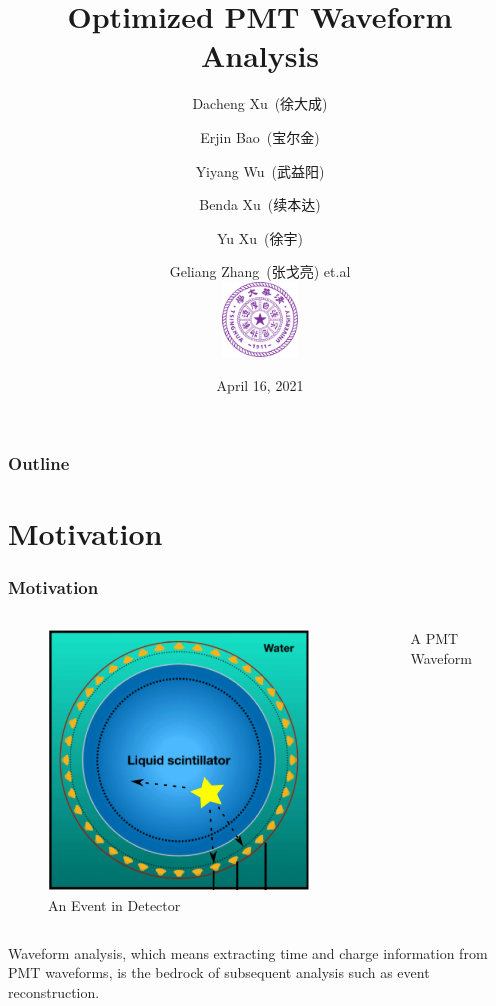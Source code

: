\documentclass{beamer}
\title[Waveform Analysis]{Optimized PMT Waveform Analysis}
\author[Dacheng Xu]{Dacheng Xu~(徐大成) \and Erjin Bao~(宝尔金) \and Yiyang Wu~(武益阳) \and Benda Xu~(续本达) \and Yu Xu~(徐宇) \and Geliang Zhang~(张戈亮) et.al \\ [4mm] \includegraphics[height=2cm]{img/Tsinghua_University_Logo.png}}
\date[JUNO]{April 16, 2021}
\begin{document}
\frame{\titlepage}

\begin{frame}[noframenumbering]
\frametitle{Outline}
\thispagestyle{empty}
\tableofcontents
\end{frame}

\section{Motivation}

\begin{frame}
\frametitle{Motivation}
\begin{columns}
\begin{figure}
    \centering
    \includegraphics[width=1.0\linewidth]{img/event.png}
    \caption{An Event in Detector}
\end{figure}
\begin{figure}
    \centering
    \resizebox{\textwidth}{!}{}
    \caption{A PMT Waveform}
\end{figure}
\end{columns}
\begin{block}{}
Waveform analysis, which means extracting time and charge information from PMT waveforms, is the bedrock of subsequent analysis such as event reconstruction. 
\end{block}
\end{frame}
\end{document}
